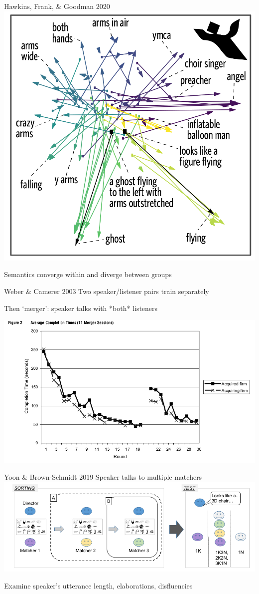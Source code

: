 \documentclass[ 12pt, xcolor=beamer,table,usenames,dvipsnames, ignorenonframetext, ngerman]{beamer}
\begin{document}
\begin{frame}{Hawkins, Frank, \& Goodman 2020}
	\includegraphics[width=.6\textwidth]{../images/hawkins_semantics.png}
	
	Semantics converge within and diverge between groups
\end{frame}

\begin{frame}{Weber \& Camerer 2003}
	\pause
	Two speaker/listener pairs train separately 
	
	Then `merger': speaker talks with *both* listeners \pause
	
	\includegraphics[width=\textwidth]{../images/weber.png}
	
\end{frame}

\begin{frame}{Yoon \& Brown-Schmidt 2019}
	Speaker talks to multiple matchers \\
	
	
	\includegraphics[width=\textwidth]{../images/yoon_diagram.png}
	
	Examine speaker's utterance length, elaborations, disfluencies
\end{frame}
\end{document}
